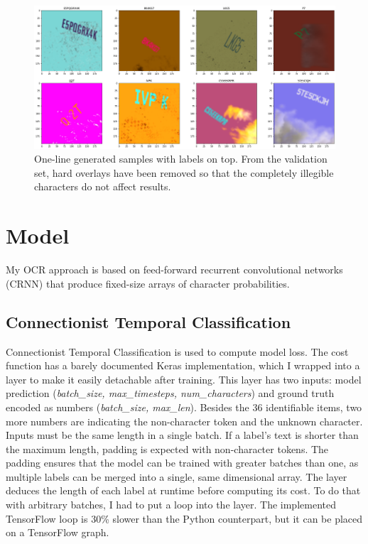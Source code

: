 \begin{figure}[htb]
 \centerline{\includegraphics[width=1.0\columnwidth]{.//Figure/OCR/generated.png}}
 \caption{One-line generated samples with labels on top. From the validation set, hard overlays have been removed so that the completely illegible characters do not affect results.}
 \label{fig:simple}
\end{figure}

\section{Model}

My OCR approach is based on feed-forward recurrent convolutional networks (CRNN) that produce fixed-size arrays of character probabilities.

\subsection{Connectionist Temporal Classification}

Connectionist Temporal Classification\cite{CTC} is used to compute model loss. The cost function has a barely documented Keras implementation, which I wrapped into a layer to make it easily detachable after training. This layer has two inputs: model prediction (\textit{batch\_size, max\_timesteps, num\_characters}) and ground truth encoded as numbers (\textit{batch\_size, max\_len}). Besides the 36 identifiable items, two more numbers are indicating the non-character token and the unknown character. Inputs must be the same length in a single batch. If a label's text is shorter than the maximum length, padding is expected with non-character tokens. The padding ensures that the model can be trained with greater batches than one, as multiple labels can be merged into a single, same dimensional array. The layer deduces the length of each label at runtime before computing its cost. To do that with arbitrary batches, I had to put a loop into the layer. The implemented TensorFlow loop is 30\% slower than the Python counterpart, but it can be placed on a TensorFlow graph.

